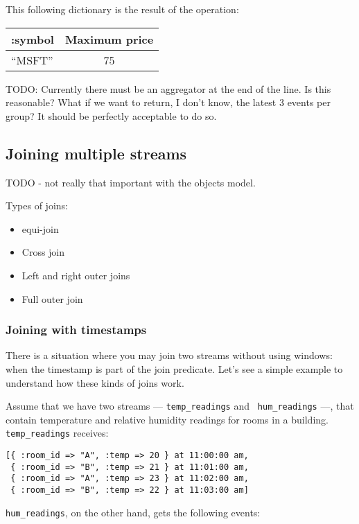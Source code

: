 \documentclass{report}
\begin{document}
This following dictionary is the result of the operation:

\begin{tabular}{ |l|c| }
  \hline
  :symbol & Maximum price \\
  \hline
  ``MSFT'' & 75 \\
  \hline
\end{tabular}



TODO: Currently there must be an aggregator at the end of the line. Is
this reasonable? What if we want to return, I don't know, the latest 3
events per group? It should be perfectly acceptable to do so.

\subsection{Joining multiple streams}
\label{sec:join}

TODO - not really that important with the objects model.

Types of joins:
\begin{itemize}
\item equi-join
\item Cross join
\item Left and right outer joins
\item Full outer join
\end{itemize}

\subsubsection{Joining with timestamps}
\label{sec:timestamp-join}

There is a situation where you may join two streams without using
windows: when the timestamp is part of the join predicate. Let's see a
simple example to understand how these kinds of joins work.

Assume that we have two streams --- {\tt temp\_readings} and {\tt
  hum\_readings} ---, that contain temperature and relative humidity
readings for rooms in a building. \verb=temp_readings= receives:

\begin{verbatim}
[{ :room_id => "A", :temp => 20 } at 11:00:00 am,
 { :room_id => "B", :temp => 21 } at 11:01:00 am,
 { :room_id => "A", :temp => 23 } at 11:02:00 am,
 { :room_id => "B", :temp => 22 } at 11:03:00 am]
\end{verbatim}

\verb=hum_readings=, on the other hand, gets the following events:
\end{document}
